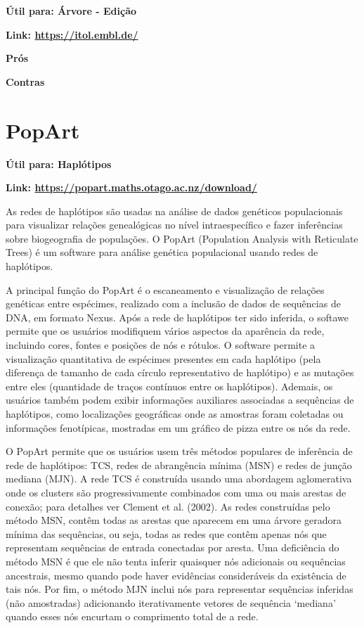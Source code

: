 \documentclass[
  letterpaper,
  DIV=11,
  numbers=noendperiod]{scrreprt}
\begin{document}
\textbf{Útil para: {Árvore - Edição}}

\textbf{Link: \url{https://itol.embl.de/}}

\textbf{Prós}

\textbf{Contras}

\hypertarget{popart}{%
\section{PopArt}\label{popart}}

\textbf{Útil para: {Haplótipos}}

\textbf{Link: \url{https://popart.maths.otago.ac.nz/download/}}

As redes de haplótipos são usadas na análise de dados genéticos
populacionais para visualizar relações genealógicas no nível
intraespecífico e fazer inferências sobre biogeografia de populações. O
PopArt (Population Analysis with Reticulate Trees) é um software para
análise genética populacional usando redes de haplótipos.

A principal função do PopArt é o escaneamento e visualização de relações
genéticas entre espécimes, realizado com a inclusão de dados de
sequências de DNA, em formato Nexus. Após a rede de haplótipos ter sido
inferida, o softawe permite que os usuários modifiquem vários aspectos
da aparência da rede, incluindo cores, fontes e posições de nós e
rótulos. O software permite a visualização quantitativa de espécimes
presentes em cada haplótipo (pela diferença de tamanho de cada círculo
representativo de haplótipo) e as mutações entre eles (quantidade de
traços contínuos entre os haplótipos). Ademais, os usuários também podem
exibir informações auxiliares associadas a sequências de haplótipos,
como localizações geográficas onde as amostras foram coletadas ou
informações fenotípicas, mostradas em um gráfico de pizza entre os nós
da rede.

O PopArt permite que os usuários usem três métodos populares de
inferência de rede de haplótipos: TCS, redes de abrangência mínima (MSN)
e redes de junção mediana (MJN). A rede TCS é construída usando uma
abordagem aglomerativa onde os clusters são progressivamente combinados
com uma ou mais arestas de conexão; para detalhes ver Clement et al.
(2002). As redes construídas pelo método MSN, contêm todas as arestas
que aparecem em uma árvore geradora mínima das sequências, ou seja,
todas as redes que contêm apenas nós que representam sequências de
entrada conectadas por aresta. Uma deficiência do método MSN é que ele
não tenta inferir quaisquer nós adicionais ou sequências ancestrais,
mesmo quando pode haver evidências consideráveis da existência de tais
nós. Por fim, o método MJN inclui nós para representar sequências
inferidas (não amostradas) adicionando iterativamente vetores de
sequência `mediana' quando esses nós encurtam o comprimento total de a
rede.
\end{document}
